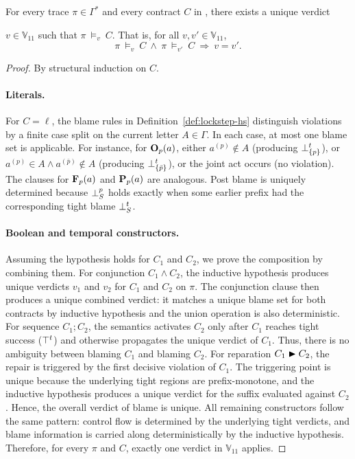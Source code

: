 \begin{lemma}
\label{lem:blame-deterministic}
For every trace $\pi\in\Gamma^*$ and every contract $C$ in \cDL, there exists a unique verdict

$v\in\mathbb{V}_{11}$ such that $\pi\ \vDash_{v}\ C$.
That is, for all $v,v'\in\mathbb{V}_{11}$,
\[
\pi\ \vDash_{v}\ C\ \land\ \pi\ \vDash_{v'}\ C\ \Longrightarrow\ v=v'.
\]
\end{lemma}
\begin{proof}
By structural induction on $C$.
\paragraph{Literals.}
For $C=\ell$, the blame rules in Definition~\ref{def:lockstep-hs} distinguish violations by a finite case split on the current letter $A\in\Gamma$.
In each case, at most one blame set is applicable.
For instance, for $\obl[p]{a}$, either $a^{(p)}\notin A$ (producing $\bottp{\{p\}}$), or $a^{(p)}\in A\land a^{(\bar p)}\notin A$ (producing $\bottp{\{\bar p\}}$), or the joint act occurs (no violation).
The clauses for $\frb[p]{a}$ and $\perm[p]{a}$ are analogous.
Post blame is uniquely determined because $\botpp{S}$ holds exactly when some earlier prefix had the corresponding tight blame $\bottp{S}$.



\paragraph{Boolean and temporal constructors.}
Assuming the hypothesis holds for $C_1$ and $C_2$, we prove the composition by combining them.
For conjunction $C_1\wedge C_2$, the inductive hypothesis produces unique verdicts $v_1$ and $v_2$ for $C_1$ and $C_2$ on $\pi$.
The conjunction clause then produces a unique combined verdict: it matches a unique blame set for both contracts by inductive hypothesis and the union operation is also deterministic.
For sequence $C_1;C_2$, the semantics activates $C_2$ only after $C_1$ reaches tight success ($\topt$) and otherwise propagates the unique verdict of $C_1$.
Thus, there is no ambiguity between blaming $C_1$ and blaming $C_2$.
For reparation $C_1\repair C_2$, the repair is triggered by the first decisive violation of $C_1$.
The triggering point is unique because the underlying tight regions are prefix-monotone, and the inductive hypothesis produces a unique verdict for the suffix evaluated against $C_2$.
Hence, the overall verdict of blame is unique.
All remaining constructors follow the same pattern: control flow is determined by the underlying tight verdicts, and blame information is carried along deterministically by the inductive hypothesis.
Therefore, for every $\pi$ and $C$, exactly one verdict in $\mathbb{V}_{11}$ applies.
\end{proof}

